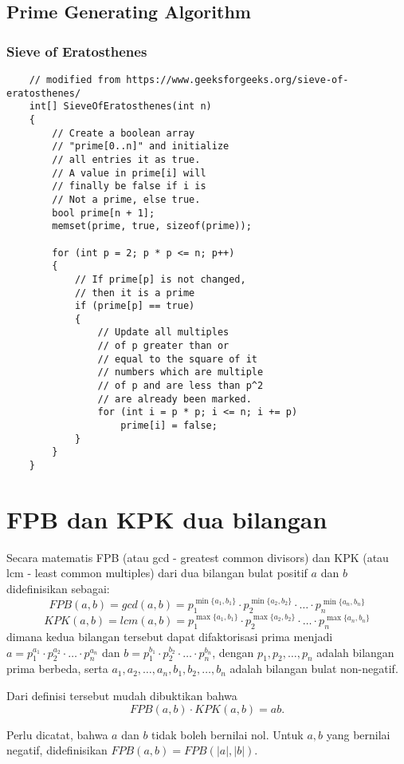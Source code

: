 	\subsection{Prime Generating Algorithm}
	\subsubsection{Sieve of Eratosthenes}
	\begin{lstlisting}
	// modified from https://www.geeksforgeeks.org/sieve-of-eratosthenes/
	int[] SieveOfEratosthenes(int n)
	{
	    // Create a boolean array
	    // "prime[0..n]" and initialize
	    // all entries it as true.
	    // A value in prime[i] will
	    // finally be false if i is
	    // Not a prime, else true.
	    bool prime[n + 1];
	    memset(prime, true, sizeof(prime));
	 
	    for (int p = 2; p * p <= n; p++)
	    {
	        // If prime[p] is not changed,
	        // then it is a prime
	        if (prime[p] == true)
	        {
	            // Update all multiples
	            // of p greater than or
	            // equal to the square of it
	            // numbers which are multiple
	            // of p and are less than p^2
	            // are already been marked.
	            for (int i = p * p; i <= n; i += p)
	                prime[i] = false;
	        }
	    }
	}
	\end{lstlisting}
	
	
  	\section{FPB dan KPK dua bilangan}
	 Secara matematis FPB (atau gcd - greatest common divisors) dan KPK (atau lcm - least common multiples) dari dua bilangan bulat positif $a$ dan $b$ 
	 didefinisikan sebagai:
	 $$FPB(a,b) = gcd(a,b) = p_1^{\min\{a_1,b_1\}}\cdot p_2^{\min\{a_2,b_2\}} \cdot \ldots \cdot p_n^{\min\{a_n,b_n\}}$$
	 $$KPK(a,b) = lcm(a,b) =p_1^{\max\{a_1,b_1\}}\cdot p_2^{\max\{a_2,b_2\}} \cdot \ldots \cdot p_n^{\max\{a_n,b_n\}}$$
	 dimana kedua bilangan tersebut dapat difaktorisasi prima menjadi
	 $a=p_1^{a_1}\cdot p_2^{a_2}\cdot \ldots \cdot p_n^{a_n}$ dan $b=p_1^{b_1}\cdot p_2^{b_2} \cdot \ldots \cdot p_n^{b_n}$, dengan $p_1,p_2,\dots,p_n$ adalah bilangan prima berbeda, serta $a_1,a_2,\dots,a_n,b_1,b_2,\dots,b_n$ adalah bilangan bulat non-negatif.
	 
	 Dari definisi tersebut mudah dibuktikan bahwa
	 $$FPB(a,b) \cdot KPK(a,b) = ab.$$
	 
	 Perlu dicatat, bahwa $a$ dan $b$ tidak boleh bernilai nol. Untuk $a,b$ yang bernilai negatif, didefinisikan $FPB(a,b) = FPB(|a|,|b|)$.
	 
